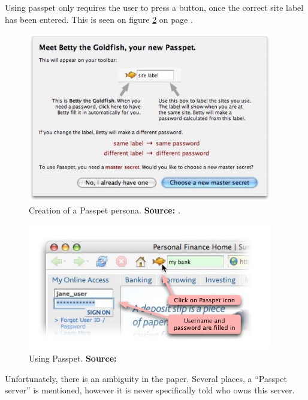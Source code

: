 			Using passpet only requires the user to press a button, once the correct site label has been entered. This is seen on figure \ref{fig:passpet_main} on page \pageref{fig:passpet_main}.


			\begin{figure}[htbp]
				\centering
				\includegraphics[width=0.95\textwidth]{figures/analysis/passpet_persona.png}
				\caption{Creation of a Passpet persona. \textbf{Source:} \cite[p.4]{passpet}.}
				\label{fig:passepet_persona}
			\end{figure}

			\begin{figure}[htbp]
				\centering
				\includegraphics[width=0.95\textwidth]{figures/analysis/passpet.png}
				\caption{Using Passpet. \textbf{Source:} \cite[p.1]{passpet}}
				\label{fig:passpet_main}
			\end{figure}

			Unfortunately, there is an ambiguity in the paper. Several places, a ``Passpet server'' is mentioned, however it is never specifically told who owns this server. 

